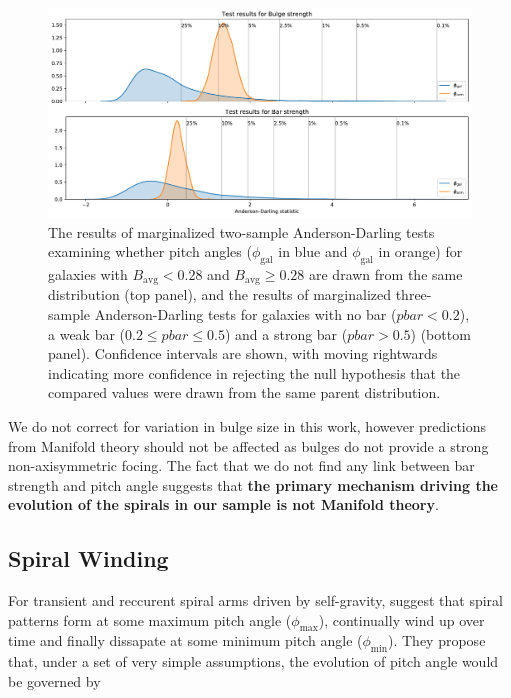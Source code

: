 \begin{figure}
  \includegraphics[width=17.7cm]{plots/bulge_bar_test_results.pdf}
  \caption{The results of marginalized two-sample Anderson-Darling tests examining whether pitch angles ($\phi_\mathrm{gal}$ in blue and $\phi_\mathrm{gal}$ in orange) for galaxies with $B_\mathrm{avg} < 0.28$ and $B_\mathrm{avg} \ge 0.28$ are drawn from the same distribution (top panel), and the results of marginalized three-sample Anderson-Darling tests for galaxies with no bar ($\mathrm{\textit{pbar}} < 0.2$), a weak bar ($0.2 \le \mathrm{\textit{pbar}} \le 0.5$) and a strong bar ($\mathrm{\textit{pbar}} > 0.5$) (bottom panel). Confidence intervals are shown, with moving rightwards indicating more confidence in rejecting the null hypothesis that the compared values were drawn from the same parent distribution.}
  \label{fig:ad-morphology-test}
\end{figure}

We do not correct for variation in bulge size in this work, however predictions from Manifold theory should not be affected as bulges do not provide a strong non-axisymmetric focing. The fact that we do not find any link between bar strength and pitch angle suggests that \textbf{the primary mechanism driving the evolution of the spirals in our sample is not Manifold theory}.

\subsection{Spiral Winding}
\label{section:spiral_winding}

For transient and reccurent spiral arms driven by self-gravity, \citet{2019arXiv190910291P} suggest that spiral patterns form at some maximum pitch angle ($\phi_\mathrm{max}$), continually wind up over time and finally dissapate at some minimum pitch angle ($\phi_\mathrm{min}$). They propose that, under a set of very simple assumptions, the evolution of pitch angle would be governed by

